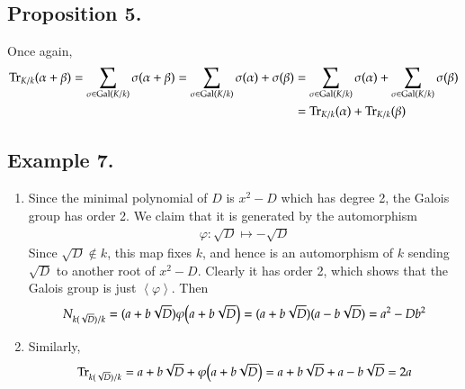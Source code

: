 \documentclass[12pt]{article}
\theoremstyle{definitionstyle}
\def \cph{\varphi}
\newcommand{\gen}[1]{\left\langle #1 \right\rangle}
\newcommand{\Gal}{\mathrm{Gal}\qty}
\begin{document}
	\subsection*{Proposition 5.}
	Once again,
	\begin{align*}
		\Tr_{K/k}(\alpha+\beta) = \sum_{\sigma \in \Gal(K/k)} \sigma(\alpha+\beta) = \sum_{\sigma \in \Gal(K/k)} \sigma(\alpha) + \sigma(\beta) &= \sum_{\sigma \in \Gal(K/k)} \sigma(\alpha) + \sum_{\sigma \in \Gal(K/k)} \sigma(\beta) 
		\\&= \Tr_{K/k}(\alpha) + \Tr_{K/k}(\beta)
	\end{align*}
	
	\subsection*{Example 7.}
	\begin{enumerate}[label=(\arabic*)]
		\item Since the minimal polynomial of $D$ is $x^2-D$ which has degree 2, the Galois group has order 2. We claim that it is generated by the automorphism
		\begin{align*}
			\cph: \sqrt{D} \mapsto -\sqrt{D}
		\end{align*}
		Since $\sqrt{D} \not \in k$, this map fixes $k$, and hence is an automorphism of $k$ sending $\sqrt{D}$ to another root of $x^2-D$. Clearly it has order 2, which shows that the Galois group is just $\gen{\cph}$. Then 
		\begin{align*}
			N_{k(\sqrt{D})/k} = (a+b\sqrt{D})\cph\qty(a+b\sqrt{D}) = (a+b\sqrt{D})(a-b\sqrt{D}) = a^2-Db^2
		\end{align*}
		\item Similarly,
		\begin{align*}
			\Tr_{k(\sqrt{D})/k} = a+b\sqrt{D} + \cph\qty(a+b\sqrt{D}) = a + b\sqrt{D} + a - b\sqrt{D} = 2a
		\end{align*}
	\end{enumerate}
	
\end{document}
